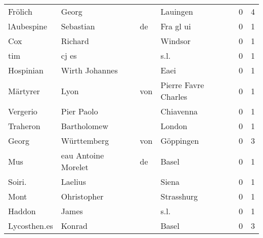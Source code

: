 \begin{tabular}{llllrr}
                  Frölich &                              Georg &             &                                    Lauingen &          0 &         4 \\
               lAubespine &                          Sebastian &          de &                                   Fra gl ui &          0 &         1 \\
                      Cox &                            Richard &             &                                     Windsor &          0 &         1 \\
                      tim &                              cj es &             &                                        s.l. &          0 &         1 \\
                Hospinian &                     Wirth Johannes &             &                                        Eaei &          0 &         1 \\
                 Märtyrer &                               Lyon &         von &                        Pierre Favre Charles &          0 &         1 \\
                 Vergerio &                         Pier Paolo &             &                                   Chiavenna &          0 &         1 \\
                 Traheron &                        Bartholomew &             &                                      London &          0 &         1 \\
                    Georg &                        Württemberg &         von &                                   Göppingen &          0 &         3 \\
                      Mus &                eau Antoine Morelet &          de &                                       Basel &          0 &         1 \\
                   Soiri. &                            Laelius &             &                                       Siena &          0 &         1 \\
                     Mont &                        Ohristopher &             &                                  Strasshurg &          0 &         1 \\
                   Haddon &                              James &             &                                        s.l. &          0 &         1 \\
             Lycosthen.es &                             Konrad &             &                                       Basel &          0 &         3 \\

\end{tabular}
